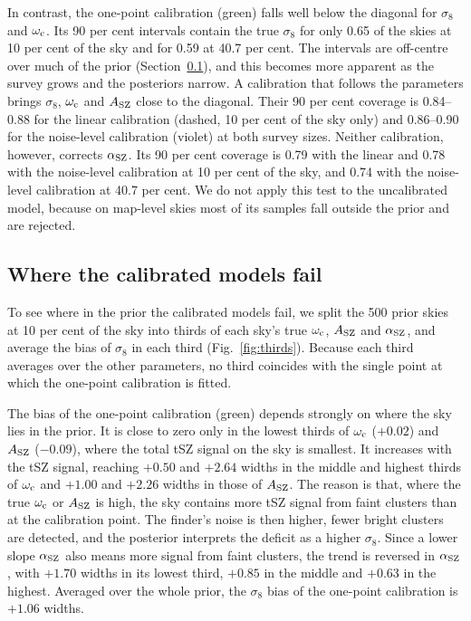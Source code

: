 In contrast, the one-point calibration (green) falls well below the diagonal for $\sigma_8$ and $\omega_\mathrm{c}$. Its 90 per cent intervals contain the true $\sigma_8$ for only 0.65 of the skies at 10 per cent of the
sky and for 0.59 at 40.7 per cent. The intervals are off-centre over much of the prior
(Section~\ref{sec:results:thirds}), and this becomes more apparent as the survey grows and the posteriors
narrow. A calibration that follows the parameters brings $\sigma_8$, $\omega_\mathrm{c}$ and $A_\mathrm{SZ}$ close to the
diagonal. Their 90 per cent coverage is 0.84--0.88 for the linear calibration (dashed, 10 per cent of the
sky only) and 0.86--0.90 for the noise-level calibration (violet) at both survey sizes. Neither calibration, however, corrects $\alpha_\mathrm{SZ}$. Its 90 per cent coverage is 0.79 with the linear and 0.78 with
the noise-level calibration at 10 per cent of the sky, and 0.74 with the noise-level calibration at 40.7
per cent. We do not apply this test to the uncalibrated model, because on map-level skies most of its samples
fall outside the prior and are rejected.

\subsection{Where the calibrated models fail}\label{sec:results:thirds}

To see where in the prior the calibrated models fail, we split the 500 prior skies at 10 per cent of the
sky into thirds of each sky's true $\omega_\mathrm{c}$, $A_\mathrm{SZ}$ and $\alpha_\mathrm{SZ}$, and average the bias of $\sigma_8$ in each
third (Fig.~\ref{fig:thirds}). Because each third averages over the other parameters, no third coincides
with the single point at which the one-point calibration is fitted.

The bias of the one-point calibration (green) depends strongly on where the sky lies in the prior. It is
close to zero only in the lowest thirds of $\omega_\mathrm{c}$ ($+0.02$) and $A_\mathrm{SZ}$ ($-0.09$), where the total tSZ
signal on the sky is smallest. It increases with the tSZ signal, reaching $+0.50$ and $+2.64$ widths
in the middle and highest thirds of $\omega_\mathrm{c}$ and $+1.00$ and $+2.26$ widths in those of $A_\mathrm{SZ}$. The reason is
that, where the true $\omega_\mathrm{c}$ or $A_\mathrm{SZ}$ is high, the sky contains more tSZ signal from faint clusters than at the calibration point. The finder's noise is then higher, fewer bright clusters are detected, and the
posterior interprets the deficit as a higher $\sigma_8$. Since a lower slope $\alpha_\mathrm{SZ}$ also means more signal
from faint clusters, the trend is reversed in $\alpha_\mathrm{SZ}$, with $+1.70$ widths in its lowest third, $+0.85$ in
the middle and $+0.63$ in the highest. Averaged over the whole prior, the $\sigma_8$ bias of the one-point
calibration is $+1.06$ widths.

